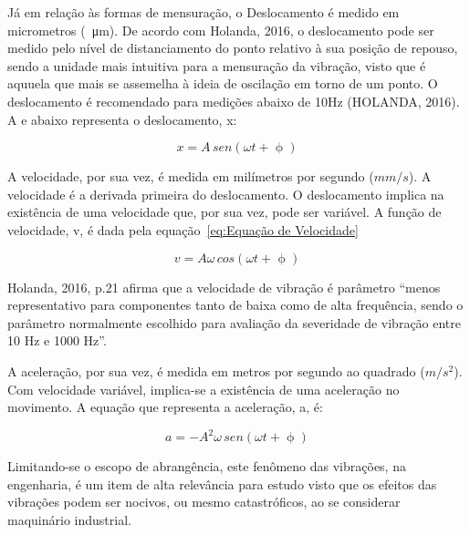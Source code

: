 \documentclass[
	12pt,				
	oneside,			
	a4paper,			
	english,			
	brazil,			
	]{abntex2ppgsi}
\begin{document}

Já em relação às formas de mensuração, o Deslocamento é medido em micrometros (\SI{}{\micro\metre}). De acordo com Holanda, 2016, o deslocamento pode ser medido pelo nível de distanciamento do ponto relativo à sua posição de repouso, sendo a unidade mais intuitiva para a mensuração da vibração, visto que é aquuela que mais se assemelha à ideia de oscilação em torno de um ponto. O deslocamento é recomendado para medições abaixo de 10Hz (HOLANDA, 2016). A e abaixo representa o deslocamento, x:

\begin{equation}
	x = A \,sen (\omega t + \upphi)
	\label{eq:Equação de deslocamento}
\end{equation}


A velocidade, por sua vez, é medida em milímetros por segundo ($mm/s$). A velocidade é a derivada primeira do deslocamento. O deslocamento implica na existência de uma velocidade que, por sua vez, pode ser variável. A função de velocidade, v, é dada pela equação~\ref{eq:Equação de Velocidade}

\begin{equation}
	v = A\omega \,cos (\omega t + \upphi)
	\label{eq:Equação de Velocidade}
\end{equation}



Holanda, 2016, p.21 afirma que a velocidade de vibração é parâmetro “menos representativo para componentes tanto de baixa como de alta frequência, sendo o parâmetro normalmente escolhido para avaliação da severidade de vibração entre 10 Hz e 1000 Hz”.

A aceleração, por sua vez, é medida em metros por segundo ao quadrado ($m/s^{2}$). Com velocidade variável, implica-se a existência de uma aceleração no movimento. A equação que representa a aceleração, a, é:

\begin{equation}
	a = -A^{2} \omega \,sen (\omega t + \upphi)
	\label{eq: Equação de Aceleração}
\end{equation}


Limitando-se o escopo de abrangência, este fenômeno das vibrações, na engenharia, é um item de alta relevância para estudo visto que os efeitos das vibrações podem ser nocivos, ou mesmo catastróficos, ao se considerar maquinário industrial. 
\end{document}
